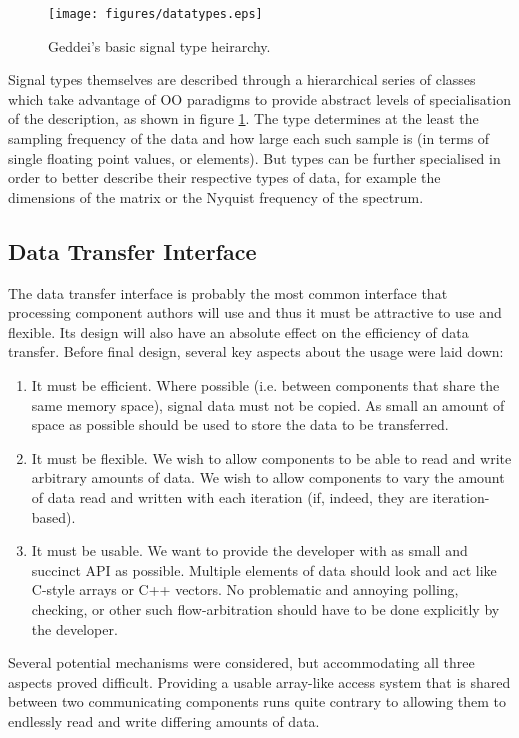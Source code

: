 \begin{figure}[ht!]
\centering
\texttt{[image: figures/datatypes.eps]}
\caption{Geddei's basic signal type heirarchy.}
\label{fig:datatypes}
\end{figure}

Signal types themselves are described through a hierarchical series of classes which take advantage of OO paradigms to provide abstract levels of specialisation of the description, as shown in figure \ref{fig:datatypes}. The type determines at the least the sampling frequency of the data and how large each such sample is (in terms of single floating point values, or elements). But types can be further specialised in order to better describe their respective types of data, for example the dimensions of the matrix or the Nyquist frequency of the spectrum.

\subsection{Data Transfer Interface}

The data transfer interface is probably the most common interface that processing component authors will use and thus it must be attractive to use and flexible. Its design will also have an absolute effect on the efficiency of data transfer. Before final design, several key aspects about the usage were laid down:

\begin{enumerate}
\item It must be efficient. Where possible (i.e. between components that share the same memory space), signal data must not be copied. As small an amount of space as possible should be used to store the data to be transferred.
\item It must be flexible. We wish to allow components to be able to read and write arbitrary amounts of data. We wish to allow components to vary the amount of data read and written with each iteration (if, indeed, they are iteration-based).
\item It must be usable. We want to provide the developer with as small and succinct API as possible. Multiple elements of data should look and act like C-style arrays or C++ vectors. No problematic and annoying polling, checking, or other such flow-arbitration should have to be done explicitly by the developer.
\end{enumerate}

Several potential mechanisms were considered, but accommodating all three aspects proved difficult. Providing a usable array-like access system that is shared between two communicating components runs quite contrary to allowing them to endlessly read and write differing amounts of data.

